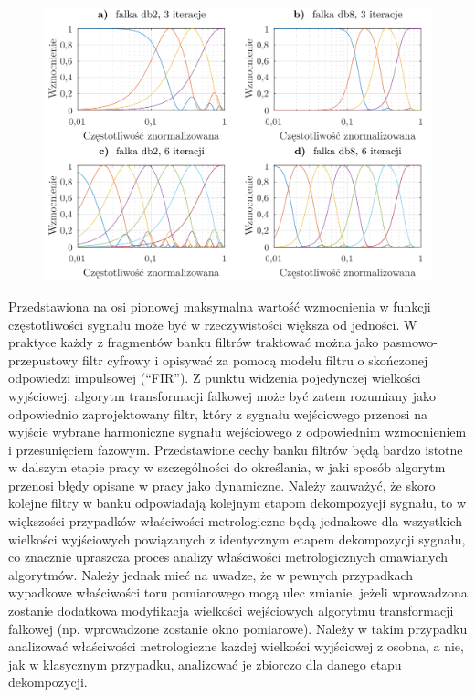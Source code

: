 \begin{figure}[htb!]
\begin{center}
\includegraphics{obrazki/bank_db_demo}
\end{center}
\end{figure}

Przedstawiona na osi pionowej maksymalna wartość wzmocnienia w funkcji częstotliwości sygnału może być w rzeczywistości większa od jedności. W praktyce każdy z fragmentów banku filtrów traktować można jako pasmowo-przepustowy filtr cyfrowy i opisywać za pomocą modelu filtru o skończonej odpowiedzi impulsowej (\enquote{FIR}). Z punktu widzenia pojedynczej wielkości wyjściowej, algorytm transformacji falkowej może być zatem rozumiany jako odpowiednio zaprojektowany filtr, który z sygnału wejściowego przenosi na wyjście wybrane harmoniczne sygnału wejściowego z odpowiednim wzmocnieniem i przesunięciem fazowym. Przedstawione cechy banku filtrów będą bardzo istotne w dalszym etapie pracy w szczególności do określania, w jaki sposób algorytm przenosi błędy opisane w pracy jako dynamiczne. Należy zauważyć, że skoro kolejne filtry w banku odpowiadają kolejnym etapom dekompozycji sygnału, to w większości przypadków właściwości metrologiczne będą jednakowe dla wszystkich wielkości wyjściowych powiązanych z identycznym etapem dekompozycji sygnału, co znacznie upraszcza proces analizy właściwości metrologicznych omawianych algorytmów. Należy jednak mieć na uwadze, że w pewnych przypadkach wypadkowe właściwości toru pomiarowego mogą ulec zmianie, jeżeli wprowadzona zostanie dodatkowa modyfikacja wielkości wejściowych algorytmu transformacji falkowej (np. wprowadzone zostanie okno pomiarowe). Należy w takim przypadku analizować właściwości metrologiczne każdej wielkości wyjściowej z osobna, a nie, jak w klasycznym przypadku, analizować je zbiorczo dla danego etapu dekompozycji.

